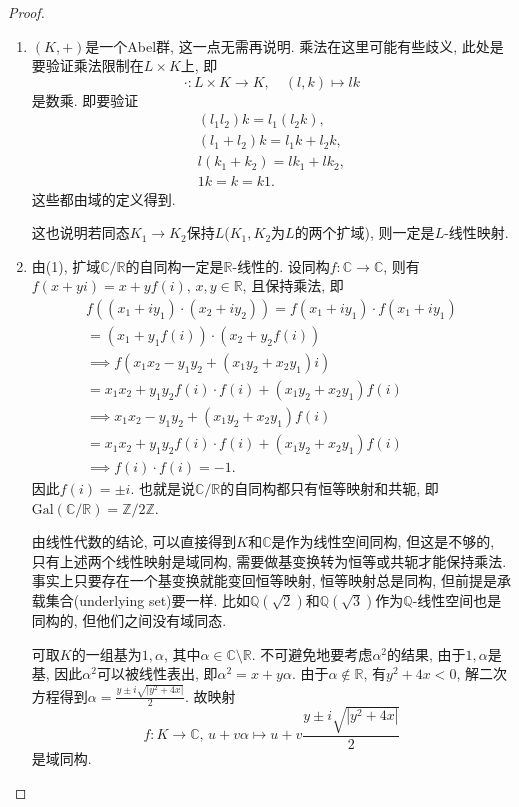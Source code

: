 \begin{proof}
    \begin{enumerate}[(1)]
        \item $(K, +)$是一个Abel群, 这一点无需再说明. 乘法在这里可能有些歧义, 此处是要验证乘法限制在$L \times K$上, 即
        \[
            \cdot: L \times K \to K, \quad (l, k) \mapsto lk
        \]
        是数乘. 即要验证
        \[
        \begin{gathered}
            (l_1l_2)k = l_1(l_2k),\\
            (l_1 + l_2)k = l_1k + l_2k,\\
            l(k_1 + k_2) = lk_1 + lk_2,\\
            1k = k = k1.
        \end{gathered}
        \]
        这些都由域的定义得到.
    
        这也说明若同态$K_1 \to K_2$保持$L$($K_1, K_2$为$L$的两个扩域), 则一定是$L$-线性映射.
        \item 由(1), 扩域$\mathbb{C}/\mathbb{R}$的自同构一定是$\mathbb{R}$-线性的. 设同构$f: \mathbb{C} \to \mathbb{C}$, 则有$f(x + yi) = x + yf(i),\, x, y \in \mathbb{R}$, 且保持乘法, 即
        \[
        \begin{gathered}
            f\left((x_1 + iy_1) \cdot (x_2 + iy_2)\right) = f(x_1 + iy_1) \cdot f(x_1 + iy_1)\\
            = (x_1 + y_1f(i)) \cdot (x_2 + y_2f(i))\\
            \implies f\left(x_1x_2 - y_1y_2 + (x_1y_2 +x_2y_1)i\right)\\
            = x_1x_2 + y_1y_2f(i) \cdot f(i) + (x_1y_2 +x_2y_1)f(i)\\
            \implies x_1x_2 - y_1y_2 + (x_1y_2 +x_2y_1)f(i)\\
            = x_1x_2 + y_1y_2f(i) \cdot f(i) + (x_1y_2 +x_2y_1)f(i)\\
            \implies f(i) \cdot f(i) = -1.
        \end{gathered}
        \]
        因此$f(i) = \pm i$. 也就是说$\mathbb{C}/\mathbb{R}$的自同构都只有恒等映射和共轭, 即$\mathrm{Gal}(\mathbb{C}/\mathbb{R}) = \mathbb{Z}/2\mathbb{Z}$.
        
        由线性代数的结论, 可以直接得到$K$和$\mathbb{C}$是作为线性空间同构, 但这是不够的, 只有上述两个线性映射是域同构, 需要做基变换转为恒等或共轭才能保持乘法. 事实上只要存在一个基变换就能变回恒等映射, 恒等映射总是同构, 但前提是承载集合(underlying set)要一样. 比如$\mathbb{Q}(\sqrt{2})$和$\mathbb{Q}(\sqrt{3})$作为$\mathbb{Q}$-线性空间也是同构的, 但他们之间没有域同态.
        
        可取$K$的一组基为$1, \alpha$, 其中$\alpha \in \mathbb{C} \setminus \mathbb{R}$. 不可避免地要考虑$\alpha^2$的结果, 由于$1, \alpha$是基, 因此$\alpha^2$可以被线性表出, 即$\alpha^2 = x + y\alpha$. 由于$\alpha \notin \mathbb{R}$, 有$y^2 + 4x < 0$, 解二次方程得到$\alpha = \frac{y \pm i\sqrt{|y^2 + 4x|}}{2}$. 故映射
        \[
            f: K \to \mathbb{C},\, u + v\alpha \mapsto u + v\frac{y \pm i\sqrt{|y^2 + 4x|}}{2}
        \]
        是域同构.
    \end{enumerate}
\end{proof}

